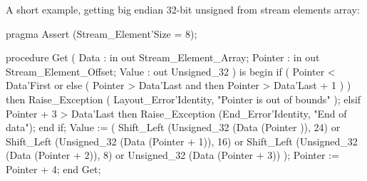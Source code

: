 
A short example, getting big endian 32-bit unsigned from stream elements
array:

   pragma Assert (Stream_Element'Size = 8);

   procedure Get
             (  Data    : in out Stream_Element_Array;
                Pointer : in out Stream_Element_Offset;
                Value   : out Unsigned_32
             )  is
   begin
      if (  Pointer < Data'First
         or else
            (  Pointer > Data'Last
            and then
               Pointer > Data'Last + 1
         )  )
      then
         Raise_Exception
         (  Layout_Error'Identity,
            "Pointer is out of bounds"
         );
      elsif Pointer + 3 > Data'Last then
         Raise_Exception (End_Error'Identity, "End of data");
      end if;
      Value :=
         (  Shift_Left (Unsigned_32 (Data (Pointer    )), 24)
         or Shift_Left (Unsigned_32 (Data (Pointer + 1)), 16)
         or Shift_Left (Unsigned_32 (Data (Pointer + 2)), 8)
         or             Unsigned_32 (Data (Pointer + 3))
         );
      Pointer := Pointer + 4;
   end Get;
